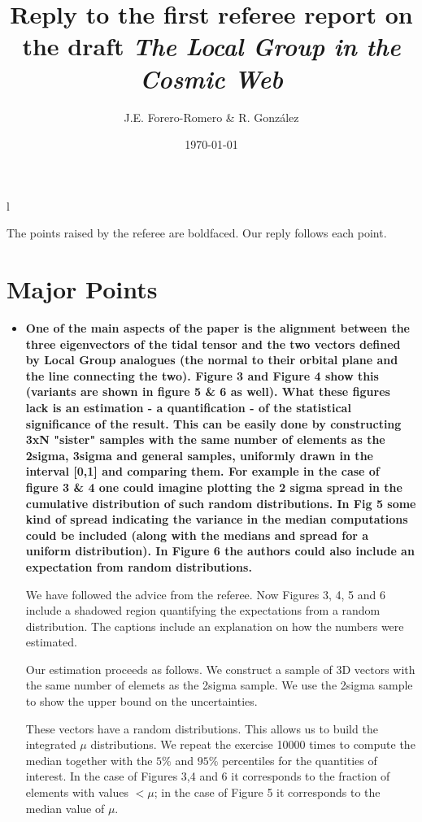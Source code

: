 \documentclass{article}
\title{Reply to the first referee report on the draft {\it The Local Group in the Cosmic Web}}
\author{J.E. Forero-Romero \& R. Gonz\'alez}
\date{\today}
\begin{document}
\maketitle
l

The points raised by the referee are boldfaced. Our reply follows each point.


\section{Major Points}
\begin{itemize}

\item
{\bf One of the main aspects of the paper is the alignment between the three eigenvectors of the tidal tensor and the two vectors defined by Local Group analogues (the normal to their orbital plane and the line connecting the two). Figure 3 and Figure 4 show this (variants are shown in figure 5 \& 6 as well). What these figures lack is an estimation - a quantification - of the statistical significance of the result. This can be easily done by constructing 3xN "sister" samples with the same number of elements as the 2sigma, 3sigma and general samples, uniformly drawn in the interval [0,1] and comparing them. For example in the case of figure 3 \& 4 one could imagine plotting the 2 sigma spread in the cumulative distribution of such random distributions. In Fig 5 some kind of spread indicating the variance in the median computations could be included (along with the medians and spread for a uniform distribution). In Figure 6 the authors could also include an expectation from random distributions.}

We have followed the advice from the referee. Now Figures 3, 4, 5 and 6 include a shadowed region quantifying the expectations from a random distribution. The captions include an explanation on how the numbers were estimated.

Our estimation proceeds as follows. We construct a sample of 3D vectors with the same number of elemets as the 2sigma sample. We use the 2sigma sample to show the upper bound on the uncertainties. 

These vectors have a random distributions. This allows us to build the integrated $\mu$ distributions. We repeat the exercise 10000 times to compute the median together with the $5\%$ and $95\%$ percentiles for the quantities of interest. In the case of Figures 3,4 and 6 it corresponds to the fraction of elements with values $<\mu$; in the case of Figure 5 it corresponds to the median value of $\mu$.







\end{itemize}
\end{document}
